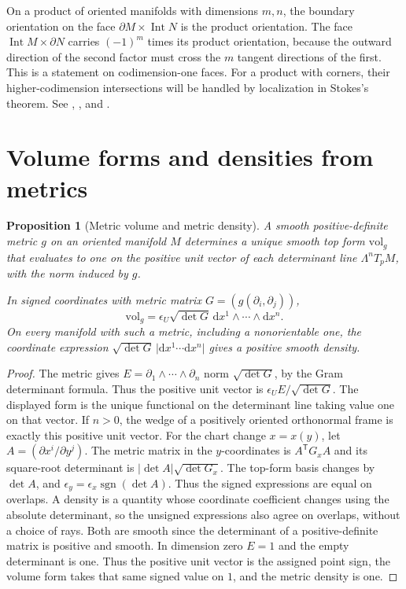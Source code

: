 \documentclass[11pt,oneside,openany]{book}
\newtheorem{proposition}[theorem]{Proposition}
\theoremstyle{definition}
\theoremstyle{remark}
\newcommand{\dd}{\mathrm d}
\begin{document}
On a product of oriented manifolds with dimensions \(m,n\), the boundary orientation on the face \(\partial M\times \operatorname{Int} N\) is the product orientation. The face \(\operatorname{Int}M\times\partial N\) carries \((-1)^m\) times its product orientation, because the outward direction of the second factor must cross the \(m\) tangent directions of the first. This is a statement on codimension-one faces. For a product with corners, their higher-codimension intersections will be handled by localization in Stokes's theorem. See \cite[Proposition 15.24]{lee}, \cite[Sections 22.3--22.6]{tu}, and \cite[p.~254]{tuerrata}.

\section{Volume forms and densities from metrics}

\begin{proposition}[Metric volume and metric density]
\label{p104:M09.04}
A smooth positive-definite metric \(g\) on an oriented manifold \(M\) determines a unique smooth top form \(\mathrm{vol}_g\) that evaluates to one on the positive unit vector of each determinant line \(\Lambda^nT_pM\), with the norm induced by \(g\).

In signed coordinates with metric matrix \(G=(g(\partial_i,\partial_j))\),
\[
 \mathrm{vol}_g
 =\epsilon_U\sqrt{\det G}\,\dd x^1\wedge\cdots\wedge\dd x^n .
\]
On every manifold with such a metric, including a nonorientable one, the coordinate expression \(\sqrt{\det G}\,\lvert\dd x^1\cdots\dd x^n\rvert\) gives a positive smooth density.
\end{proposition}

\begin{proof}
The metric gives \(E=\partial_1\wedge\cdots\wedge\partial_n\) norm \(\sqrt{\det G}\), by the Gram determinant formula. Thus the positive unit vector is \(\epsilon_U E/\sqrt{\det G}\). The displayed form is the unique functional on the determinant line taking value one on that vector. If \(n>0\), the wedge of a positively oriented orthonormal frame is exactly this positive unit vector. For the chart change \(x=x(y)\), let \(A=(\partial x^i/\partial y^j)\). The metric matrix in the \(y\)-coordinates is \(A^{\mathsf T}G_x A\) and its square-root determinant is \(\lvert\det A\rvert\sqrt{\det G_x}\). The top-form basis changes by \(\det A\), and \(\epsilon_y=\epsilon_x\operatorname{sgn}(\det A)\). Thus the signed expressions are equal on overlaps. A density is a quantity whose coordinate coefficient changes using the absolute determinant, so the unsigned expressions also agree on overlaps, without a choice of rays. Both are smooth since the determinant of a positive-definite matrix is positive and smooth. In dimension zero \(E=1\) and the empty determinant is one. Thus the positive unit vector is the assigned point sign, the volume form takes that same signed value on \(1\), and the metric density is one.
\end{proof}
\end{document}
